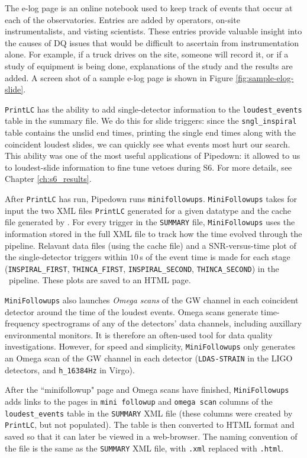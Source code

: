 The e-log page is an online notebook used to keep track of events that occur at
each of the observatories. Entries are added by operators, on-site
instrumentalists, and visting scientists. These entries provide valuable
insight into the causes of \ac{DQ} issues that would be difficult to ascertain
from instrumentation alone. For example, if a truck drives on the site, someone
will record it, or if a study of equipment is being done, explanations of the
study and the results are added. A screen shot of a sample e-log page is shown
in Figure \ref{fig:sample-elog-slide}.

\texttt{PrintLC} has the ability to add single-detector information to the
\verb|loudest_events| table in the summary file. We do this for slide triggers:
since the \verb|sngl_inspiral| table contains the unslid end times, printing
the single end times along with the coincident loudest slides, we can quickly
see what events most hurt our search. This ability was one of the most useful
applications of Pipedown: it allowed to us to loudest-slide information to fine
tune vetoes during \ac{S6}. For more details, see Chapter \ref{ch:s6_results}.

After \texttt{PrintLC} has run, Pipedown runs \verb|minifollowups|. \texttt{MiniFollowups} takes
for input the two XML files \texttt{PrintLC} generated for a given datatype and the
cache file generated by \ihope. For every trigger in the \verb|SUMMARY| file,
\texttt{MiniFollowups} uses the information stored in the full XML file to track how the
time evolved through the pipeline. Relavant data files (using the cache file)
and a \ac{SNR}-versus-time plot of the single-detector triggers within $10\,$s
of the event time is made for each stage (\verb|INSPIRAL_FIRST|,
\verb|THINCA_FIRST|, \verb|INSPIRAL_SECOND|, \verb|THINCA_SECOND|) in the
\hipe~pipeline. These plots are saved to an HTML page.

\texttt{MiniFollowups} also launches \emph{Omega scans} \cite{omegaScan} of the \ac{GW}
channel in each coincident detector around the time of the loudest events.
Omega scans generate time-frequency spectrograms of any of the detectors' data
channels, including auxillary environmental monitors. It is therefore an
often-used tool for data quality investigations. However, for speed and
simplicity, \texttt{MiniFollowups} only generates an Omega scan of the \ac{GW} channel
in each detector (\verb|LDAS-STRAIN| in the \ac{LIGO} detectors, and
\verb|h_16384Hz| in Virgo).

After the ``minifollowup" page and Omega scans have finished, \texttt{MiniFollowups}
adds links to the pages in \verb|mini followup| and \verb|omega scan| columns
of the \verb|loudest_events| table in the \verb|SUMMARY| XML file (these
columns were created by \texttt{PrintLC}, but not populated). The table is then
converted to HTML format and saved so that it can later be viewed in a
web-browser. The naming convention of the file is the same as the
\verb|SUMMARY| XML file, with \verb|.xml| replaced with \verb|.html|.


